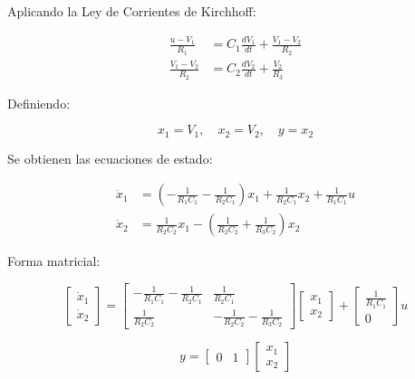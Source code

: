 \documentclass[12pt,letterpaper,twoside]{article}
\begin{document}
Aplicando la Ley de Corrientes de Kirchhoff:

\begin{align}
\frac{u - V_1}{R_1} &= C_1 \frac{dV_1}{dt} + \frac{V_1 - V_2}{R_2} \\[10pt]
\frac{V_1 - V_2}{R_2} &= C_2 \frac{dV_2}{dt} + \frac{V_2}{R_3}
\end{align}

Definiendo:

\begin{equation}
x_1 = V_1, \quad x_2 = V_2, \quad y = x_2
\end{equation}

Se obtienen las ecuaciones de estado:

\begin{align}
\dot{x}_1 &= \left( - \frac{1}{R_1 C_1} - \frac{1}{R_2 C_1} \right)x_1 
+ \frac{1}{R_2 C_1}x_2 
+ \frac{1}{R_1 C_1}u \\[10pt]
\dot{x}_2 &= \frac{1}{R_2 C_2}x_1 
- \left( \frac{1}{R_2 C_2} + \frac{1}{R_3 C_2} \right)x_2
\end{align}

Forma matricial:

\begin{equation}
\begin{bmatrix}
\dot{x}_1 \\
\dot{x}_2
\end{bmatrix}
=
\begin{bmatrix}
-\frac{1}{R_1 C_1} - \frac{1}{R_2 C_1} & \frac{1}{R_2 C_1} \\
\frac{1}{R_2 C_2} & -\frac{1}{R_2 C_2} - \frac{1}{R_3 C_2}
\end{bmatrix}
\begin{bmatrix}
x_1 \\
x_2
\end{bmatrix}
+
\begin{bmatrix}
\frac{1}{R_1 C_1} \\
0
\end{bmatrix}
u
\label{eq:ss}
\end{equation}

\begin{equation}
y =
\begin{bmatrix}
0 & 1
\end{bmatrix}
\begin{bmatrix}
x_1 \\
x_2
\end{bmatrix}
\label{eq:salida}
\end{equation}
\end{document}
